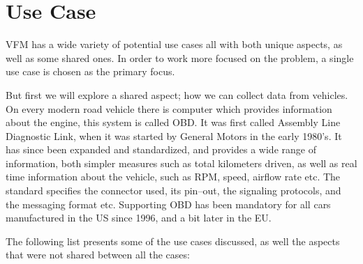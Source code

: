 \section{Use Case}\label{sec:use_case}
\acl{VFM} has a wide variety of potential use cases all with both unique aspects, as well as some shared ones.
In order to work more focused on the problem, a single use case is chosen as the primary focus.

But first we will explore a shared aspect; how we can collect data from vehicles.
On every modern road vehicle there is computer which provides information about the engine,
this system is called \ac{OBD}.
It was first called Assembly Line Diagnostic Link, when it was started by General Motors in the early 1980's.
It has since been expanded and standardized, and provides a wide range of information, both simpler measures such as total kilometers driven,
as well as real time information about the vehicle, such as RPM, speed, airflow rate etc.
The standard specifies the connector used, its pin--out, the signaling protocols, and the messaging format etc.
Supporting \ac{OBD} has been mandatory for all cars manufactured in the US since 1996, and a bit later in the EU. 

\bigskip
The following list presents some of the use cases discussed, as well the aspects that were not shared between all the cases:

